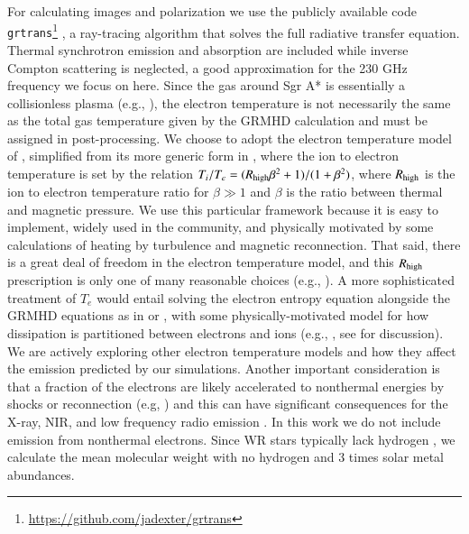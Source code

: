 \documentclass[twocolumn,twocolappendix,apjl,appendixfloats]{aastex63}
\begin{document}
For calculating images and polarization we use the publicly available code {\tt grtrans}\footnote{\href{https://github.com/jadexter/grtrans}{https://github.com/jadexter/grtrans}} \citep{Dexter2009,grtrans}, a ray-tracing algorithm that solves the full radiative transfer equation.  Thermal synchrotron emission and absorption are included while inverse Compton scattering is neglected, a good approximation for the 230 GHz frequency we focus on here.  
Since the gas around Sgr A* is essentially a collisionless plasma (e.g., \citealt{Mahadevan1997,Narayan1998}), the electron temperature is not necessarily the same as the total gas temperature given by the GRMHD calculation and must be assigned in post-processing.  We choose to adopt the electron temperature model of \citet{EHT5}, simplified from its more generic form in \citet{Mosci2016}, where the ion to electron temperature is set by the relation $T_i/T_e = (R_{\rm high} \beta^2 + 1)/(1 + \beta^2)$, where $R_{\rm high}$ is the ion to electron temperature ratio for $\beta \gg 1$ and $\beta$ is the ratio between thermal and magnetic pressure.  We use this particular framework because it is easy to implement, widely used in the community, and physically motivated by some calculations of heating by turbulence and magnetic reconnection. That said, there is a great deal of freedom in the electron temperature model, and this $R_{\rm high}$ prescription is only one of many reasonable choices (e.g., \citealt{Mosci2009,CK2015,Anantua2020}).  A more sophisticated treatment of $T_e$ would entail solving the electron entropy equation alongside the GRMHD equations as in \citet{Ressler2015} or \citet{Sadowski2017}, with some physically-motivated model for how dissipation is partitioned between electrons and ions (e.g., \citealt{Howes2010,Rowan2017,Werner2018}, see \citealt{Chael2019,Dexter2020} for discussion).   We are actively exploring other electron temperature models and how they affect the emission predicted by our simulations.  Another important consideration is that a fraction of the electrons are likely accelerated to nonthermal energies by shocks or reconnection (e.g, \citealt{Sironi2011}) and this can have significant consequences for the X-ray, NIR, and low frequency radio emission \citep{Ozel2000,Yuan2003,Ball2016,Chael2017}.  In this work we do not include emission from nonthermal electrons.
Since WR stars typically lack hydrogen \citep{Martins2007}, we calculate the mean molecular weight with no hydrogen and 3 times solar metal abundances.    
\end{document}

